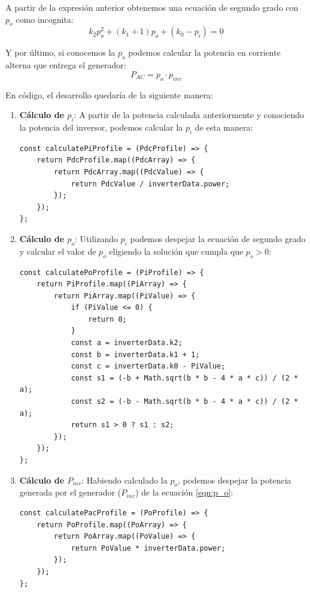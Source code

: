 A partir de la expresión anterior obtenemos una ecuación de segundo grado con $p_o$ como incognita:
\begin{equation}
k_2p_o^2 + (k_1 + 1)p_o + (k_0 - p_i) = 0
\end{equation}

Y por último, si conocemos la $p_o$ podemos calcular la potencia en corriente alterna que entrega el generador:
\begin{equation}
\label{eqn:P_AC}
P_{AC} = p_o \cdot p_{inv}
\end{equation}

En código, el desarrollo quedaría de la siguiente manera:

\begin{enumerate}
\item \textbf{Cálculo de $p_i$}: A partir de la potencia calculada anteriormente y conociendo la potencia del inversor, podemos calcular la $p_i$ de esta manera:

\begin{lstlisting}[style=ES6, caption={Cálculo de $p_i$}]
const calculatePiProfile = (PdcProfile) => {
	return PdcProfile.map((PdcArray) => {
		return PdcArray.map((PdcValue) => {
			return PdcValue / inverterData.power;
		});
	});
};
\end{lstlisting}

\item \textbf{Cálculo de $p_o$}: Utilizando $p_i$ podemos despejar la ecuación de segundo grado y calcular el valor de $p_o$ eligiendo la solución que cumpla que $p_o > 0$:

\begin{lstlisting}[style=ES6, caption={Cálculo de $p_o$}]
const calculatePoProfile = (PiProfile) => {
	return PiProfile.map((PiArray) => {
		return PiArray.map((PiValue) => {
			if (PiValue <= 0) {
				return 0;
			}
			const a = inverterData.k2;
			const b = inverterData.k1 + 1;
			const c = inverterData.k0 - PiValue;
			const s1 = (-b + Math.sqrt(b * b - 4 * a * c)) / (2 * a);
			const s2 = (-b - Math.sqrt(b * b - 4 * a * c)) / (2 * a);
			return s1 > 0 ? s1 : s2;
		});
	});
};
\end{lstlisting}

\item \textbf{Cálculo de $P_{inv}$}: Habiendo calculado la $p_o$, podemos despejar la potencia generada por el generador ($P_{inv}$) de la ecuación \ref{eqn:p_o}:

\begin{lstlisting}[style=ES6, caption={Cálculo de $P_{AC}$}]
const calculatePacProfile = (PoProfile) => {
	return PoProfile.map((PoArray) => {
		return PoArray.map((PoValue) => {
			return PoValue * inverterData.power;
		});
	});
};
\end{lstlisting}



\end{enumerate}

